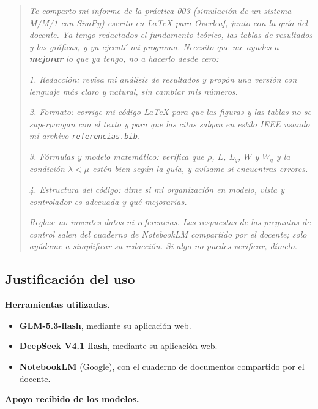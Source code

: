 \documentclass[11pt,a4paper]{article}
\begin{document}
\begin{quote}
\small
\textit{Te comparto mi informe de la práctica 003 (simulación de un sistema M/M/1 con
SimPy) escrito en \LaTeX{} para Overleaf, junto con la guía del docente. Ya tengo
redactados el fundamento teórico, las tablas de resultados y las gráficas, y ya ejecuté
mi programa. Necesito que me ayudes a \textbf{mejorar} lo que ya tengo, no a hacerlo
desde cero:}

\textit{1. Redacción: revisa mi análisis de resultados y propón una versión con
lenguaje más claro y natural, sin cambiar mis números.}

\textit{2. Formato: corrige mi código \LaTeX{} para que las figuras y las tablas no se
superpongan con el texto y para que las citas salgan en estilo IEEE usando mi archivo
\texttt{referencias.bib}.}

\textit{3. Fórmulas y modelo matemático: verifica que $\rho$, $L$, $L_q$, $W$ y $W_q$ y
la condición $\lambda < \mu$ estén bien según la guía, y avísame si encuentras errores.}

\textit{4. Estructura del código: dime si mi organización en modelo, vista y
controlador es adecuada y qué mejorarías.}

\textit{Reglas: no inventes datos ni referencias. Las respuestas de las preguntas de
control salen del cuaderno de NotebookLM compartido por el docente; solo ayúdame a
simplificar su redacción. Si algo no puedes verificar, dímelo.}
\end{quote}

\subsection{Justificación del uso}

\textbf{Herramientas utilizadas.}

\begin{itemize}
    \item \textbf{GLM-5.3-flash}, mediante su aplicación web.
    \item \textbf{DeepSeek V4.1 flash}, mediante su aplicación web.
    \item \textbf{NotebookLM} (Google), con el cuaderno de documentos compartido por el
    docente.
\end{itemize}

\textbf{Apoyo recibido de los modelos.}
\end{document}
